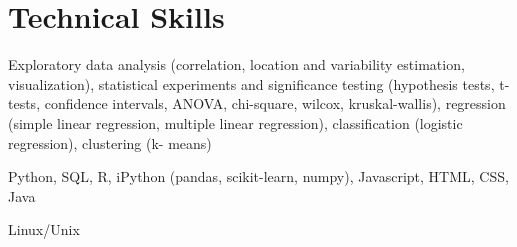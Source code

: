
\section{Technical Skills}

 Exploratory data analysis (correlation, location and variability estimation, visualization), statistical experiments and significance testing (hypothesis tests, t-tests, confidence intervals, ANOVA, chi-square, wilcox, kruskal-wallis), regression (simple linear regression, multiple linear regression), classification (logistic regression), clustering (k- means)



 Python, SQL, R, iPython (pandas, scikit-learn, numpy), Javascript, HTML, CSS, Java


 Linux/Unix
